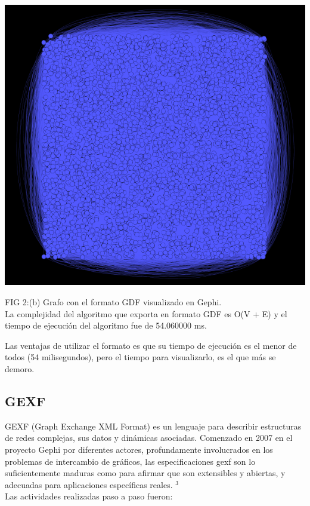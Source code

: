\documentclass[book, 16 pt, conference]{ieeeconf}
\begin{document}
\begin{center}
\includegraphics[scale=0.30]{2} 
\end{center}
FIG 2:(b) Grafo con el formato GDF visualizado en Gephi.\\

La complejidad del algoritmo que exporta en formato GDF es O(V + E) y el tiempo de ejecución del algoritmo fue de 54.060000 ms.

Las ventajas de utilizar el formato es que su tiempo de ejecución es el menor de todos (54 milisegundos), pero el tiempo para visualizarlo, es el que más se demoro.

\subsection{GEXF}

GEXF (Graph Exchange XML Format) es un lenguaje para describir estructuras de redes complejas, sus datos y dinámicas asociadas. Comenzado en 2007 en el proyecto Gephi por diferentes actores, profundamente involucrados en los problemas de intercambio de gráficos, las especificaciones gexf son lo suficientemente maduras como para afirmar que son extensibles y abiertas, y adecuadas para aplicaciones específicas reales. $^{3}$ \\

Las actividades realizadas paso a paso fueron: \\
\end{document}
